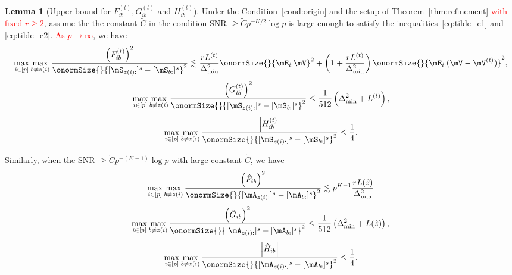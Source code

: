 \documentclass[lettersize,onecolumn,journal]{IEEEtran}
\theoremstyle{definition}
\newtheorem{lem}{Lemma}
\theoremstyle{definition}
\newcommand{\of}[1]{\left(#1\right)}
\newcommand{\aabs}[1]{\left|#1\right|}
\begin{document}
\begin{lem}[Upper bound for $F_{ib}^{(t)}, G_{ib}^{(t)}$ and $H_{ib}^{(t)}$]\label{lem:upper_fgh} Under the Condition~\ref{cond:origin} and the setup of Theorem~\ref{thm:refinement} \textcolor{red}{with fixed $r \geq 2$},  assume the the constant $\tilde C$ in the condition SNR $\geq \tilde C p^{-K/2} \log p$ is large enough to satisfy the inequalities~\eqref{eq:tilde_c1} and \eqref{eq:tilde_c2}. \textcolor{red}{As $p \rightarrow \infty$}, we have 
    \begin{equation}\label{eq:fib}
        \max_{i \in [p]} \max_{b \neq z(i)} \frac{\of{F_{ib}^{(t)}}^2}{ \onormSize{}{ [  \mS_{z(i):} ]^s  -  [ \mS_{b:} ]^s }^2 } \lesssim  \frac{r L^{(t)}}{ \Delta_{\min}^2} \onormSize{}{\mE_{i:} \mV}^2 + \of{1 +  \frac{ r L^{(t)}}{ \Delta_{\min}^2}} \onormSize{}{\mE_{i:} (\mV - \mV^{(t)})}^2 ,
    \end{equation}
    \begin{equation}\label{eq:gib}
        \max_{i \in [p]} \max_{b \neq z(i)} \frac{ \of{  G_{ib}^{(t)} }^2  }{ \onormSize{}{ [\mS_{z(i):} ]^s - [\mS_{b:}]^s }^2}  \leq  \frac{1}{512} \of{ \Delta_{\min}^2 +L^{(t)}},
    \end{equation}
    \begin{equation}\label{eq:hib}
        \max_{i \in [p]} \max_{b \neq z(i)}  \frac{ \aabs{  H_{ib}^{(t)} }  }{ \onormSize{}{ [\mS_{z(i):} ]^s - [\mS_{b:}]^s }^2} \leq \frac{1}{4}.
    \end{equation}
    
    Similarly, when the SNR $\geq \tilde C p^{-(K-1)}\log p$ with large constant $\tilde C$, we have 
     \begin{equation}\label{eq:fib_cor}
        \max_{i \in [p]} \max_{b \neq z(i)} \frac{\of{\hat F_{ib}}^2}{ \onormSize{}{ [  \mA_{z(i):} ]^s  -  [ \mA_{b:} ]^s }^2 } \lesssim p^{K-1} \frac{r L(\hat z)}{ \Delta_{\min}^2}
    \end{equation}
    \begin{equation}\label{eq:gib_cor}
        \max_{i \in [p]} \max_{b \neq z(i)} \frac{ \of{  \hat G_{ib} }^2  }{ \onormSize{}{ [\mA_{z(i):} ]^s - [\mA_{b:}]^s }^2}  \leq  \frac{1}{512} \of{ \Delta_{\min}^2 +L(\hat z)},
    \end{equation}
    \begin{equation}\label{eq:hib_cor}
        \max_{i \in [p]} \max_{b \neq z(i)}  \frac{ \aabs{  \hat H_{ib} }  }{ \onormSize{}{ [\mA_{z(i):} ]^s - [\mA_{b:}]^s }^2} \leq \frac{1}{4}.
    \end{equation}
    \end{lem}
    
\end{document}
